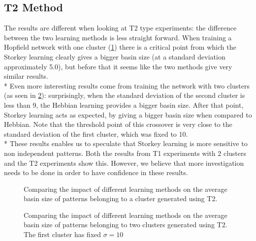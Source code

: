 \subsection{T2 Method}

The results are different when looking at T2 type experiments:
the difference between the two learning methods is less straight forward.
When training a Hopfield network with one cluster (\ref{fig:plot-storkey-T2-onecluster})  there is a critical point from which the Storkey learning clearly gives a bigger basin size
(at a standard deviation approximately 5.0), but before that it seems like the two methods give very similar results.
\\*
Even more interesting results come from training the network with two clusters (as seen in \ref{fig:plot-storkey-T2-twoclusters}): surprisingly, when the standard deviation of the second cluster
is less than 9, the Hebbian learning provides a bigger basin size. After that point, Storkey learning acts as expected, by giving a
bigger basin size when compared to Hebbian. Note that the threshold point of this crossover is very close to the standard deviation of the first
cluster, which was fixed to 10.
\\* These results enables us to speculate that Storkey learning is more sensitive to non independent patterns. Both the results from T1 experiments with
2 clusters and the T2 experiments show this. However, we believe that more investigation needs to be done in order to have confidence in these results.


\begin{figure}[h!]
  \centering
  
\caption{Comparing the impact of different learning methods on the average basin size of patterns belonging to a cluster generated using T2.}
\label{fig:plot-storkey-T2-onecluster}
\end{figure}

\begin{figure}[h]
  \centering
  
\caption{Comparing the impact of different learning methods on the average basin size of patterns belonging to two clusters generated using T2. The first cluster has fixed $\sigma = 10$}
\label{fig:plot-storkey-T2-twoclusters}
\end{figure}
